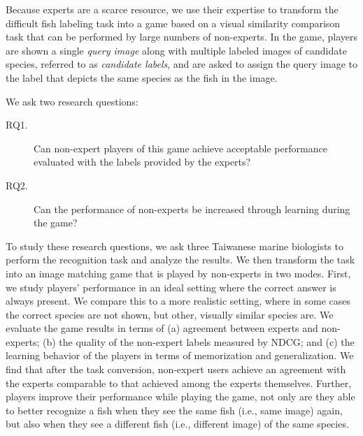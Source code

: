 
Because experts are a scarce resource, we use their expertise to
transform the difficult fish labeling task into a game based on a
visual similarity comparison task that can be performed by large
numbers of non-experts. In the game, players are shown a single
\emph{query image} along with multiple labeled images of candidate
species, referred to as \emph{candidate labels}, and are asked to
assign the query image to the label that depicts the same species as
the fish in the image. 

%
We ask two research questions:
\begin{description}
\item[RQ1.] Can non-expert players of this game achieve acceptable
performance evaluated with the labels provided by the experts?
\item[RQ2.] Can the performance of non-experts be increased through
learning during the game?
\end{description}

To study these research questions, we ask three Taiwanese marine
biologists to perform the recognition task and analyze the results.
%
We then transform the task into an image matching game that is played
by non-experts in two modes. First, we study players' performance in
an ideal setting where the correct answer is always present. 
%
We compare this to a more realistic setting, where in some cases the
correct species are not shown, but other, visually similar species
are.   
%
We evaluate the game results in terms of (a) agreement between experts
and non-experts; (b) the quality of the non-expert labels measured by
NDCG; and (c) the learning behavior of the players in terms of
memorization and generalization. %
%
%
We find that after the task conversion, non-expert users achieve an
agreement with the experts comparable to that achieved among the
experts themselves. Further, players improve their performance while
playing the game, not only are they able to better recognize a fish
when they see the same fish (i.e., same image) again, but also when
they see a different fish (i.e., different image) of the same species. 

